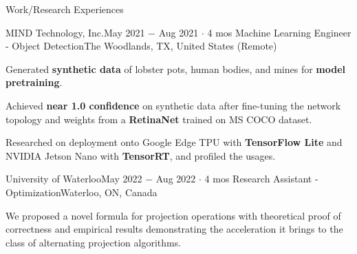 \documentclass{resume}
\begin{document}
\begin{rSection}{Work/Research Experiences}
    \begin{rSubsection}{MIND Technology, Inc.}{May 2021 \(-\) Aug 2021 \(\cdot\) 4 mos}
        {Machine Learning Engineer - Object Detection}{The Woodlands, TX, United States (Remote)}
        \item Generated \textbf{synthetic data} of lobster pots, human bodies, and mines for \textbf{model pretraining}.
        \item Achieved \textbf{near 1.0 confidence} on synthetic data after fine-tuning the network topology and weights from a \textbf{RetinaNet} trained on MS COCO dataset.
        \item Researched on deployment onto Google Edge TPU with \textbf{TensorFlow Lite} and NVIDIA Jetson Nano with \textbf{TensorRT}, and profiled the usages.
    \end{rSubsection}

    \begin{rSubsection}{University of Waterloo}{May 2022 \(-\) Aug 2022 \(\cdot\) 4 mos}
        {Research Assistant - Optimization}{Waterloo, ON, Canada}
        \item We proposed a novel formula for projection operations with theoretical proof of correctness and empirical results demonstrating the acceleration it brings to the class of alternating projection algorithms.
    \end{rSubsection}

\end{rSection}


\end{document}
